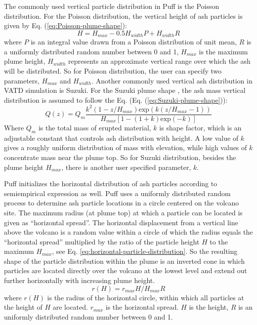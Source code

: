 \documentclass[utf8]{frontiersSCNS} %
\begin{document}
The commonly used vertical particle distribution in Puff is the Poisson distribution. For the Poisson distribution, the vertical height of ash particles is given by Eq. (\ref{eq:Poisson-plume-shape}):
\begin{equation}
H=H_{max} - 0.5 H_{width}P+H_{width}R
\label{eq:Poisson-plume-shape}
\end{equation}
where $P$ is an integral value drawn from a Poisson distribution of unit mean, $R$ is a uniformly distributed random number between 0 and 1, $H_{max}$ is the maximum plume height, $H_{width}$ represents an approximate vertical range over which the ash will be distributed. So for Poisson distribution, the user can specify two parameters, $H_{max}$ and $H_{width}$.
Another commonly used vertical ash distribution in VATD simulation is Suzuki. For the Suzuki plume shape \citep{suzuki1983theoretical}, the ash mass vertical distribution is assumed to follow the Eq. (Eq. (\ref{eq:Suzuki-plume-shape})):
\begin{equation}
Q(z)=Q_m \frac{k^2(1-z/H_{max})\mbox{exp}\left(k(z/H_{max} -1 )\right)}{H_{max}\left[1-(1+k) \mbox{exp}(-k)\right]}
\label{eq:Suzuki-plume-shape}
\end{equation}
Where $Q_m$ is the total mass of erupted material, $k$ is shape factor, which is an adjustable constant that controls ash distribution with height. A low value of $k$ gives a roughly uniform distribution of mass with elevation, while high values of $k$ concentrate mass near the plume top.
So for Suzuki distribution, besides the plume height $H_{max}$, there is another user specified parameter, $k$.

Puff initializes the horizontal distribution of ash particles according to semiempirical expression as well. Puff uses a uniformly distributed random process to determine ash particle locations in a circle centered on the volcano site. The maximum radius (at plume top) at which a particle can be located is given as ``horizontal spread''. The horizontal displacement from a vertical line above the volcano is a random value within a circle of which the radius equals the ``horizontal spread'' multiplied by the ratio of the particle height $H$ to the maximum $H_{max}$, see Eq. \ref{eq:horizontal-particle-distribution}. So the resulting shape of the particle distribution within the plume is an inverted cone in which particles are located directly over the volcano at the lowest level and extend out further horizontally with increasing plume height.
\begin{equation}
r(H)= r_{max}  H / H_{max}  R
\label{eq:horizontal-particle-distribution} 
\end{equation}
where $r(H)$ is the radius of the horizontal circle, within which all particles at the height of $H$ are located. $r_{max}$ is the horizontal spread. $H$ is the height, $R$ is an uniformly distributed random number between 0 and 1.
\end{document}
